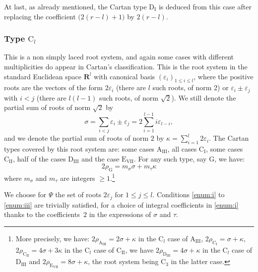 \documentclass[JEP,XML,SOM,Unicode,published]{cedram}
\newcommand{\rD}{\mathrm{D}}
\newcommand{\rI}{\mathrm{I}}
\newcommand{\RR}{\mathbf{R}}
\theoremstyle{plain}
\theoremstyle{remark}
\theoremstyle{definition}
\begin{document}
At last, as already mentioned, the Cartan type $\rD_\rI$ is deduced from this case after replacing the coefficient $ \bigl(2(r-l) + 1 \bigr)$ by $2(r-l)$.

\subsubsection*{Type $\mathrm{C}_l$
\cite[Planche III, p.\,254]{BBK-Lie-4to6}}
This is a non simply laced root system, and again some cases with different multiplicities do appear in Cartan's classification.
This is the root system in the standard Euclidean space $\RR^l$ with canonical basis $(\varepsilon_i)_{1 \leqslant i \leqslant l}$, where the positive roots are the vectors of the form $2 \varepsilon_i$ (there are $l$ such roots, of norm 2) or $\varepsilon_i \pm \varepsilon_j$ with $i<j$ (there are $l(l-1)$ such roots, of norm $\sqrt{2}$).
We still denote the partial sum of roots of norm $\sqrt{2}$ by
\[
\sigma = \sum_{i<j} \varepsilon_i \pm \varepsilon_j = 2 \sum_{i=1}^{l-1} i \varepsilon_{l-i},
\]
and we denote the partial sum of roots of norm $2$ by $\kappa = \sum_{i=1}^l 2\varepsilon_i$.
The Cartan types covered by this root system are: some cases $\mathrm{A}_\mathrm{III}$, all cases $\mathrm{C}_\rI$, some cases $\mathrm{C}_\mathrm{II}$, half of the cases $\rD_\mathrm{III}$ and the case $\mathrm{E}_\mathrm{VII}$.
For any such type, say $\mathrm{G}$, we have:
\[
2 \rho_\mathrm{G} = m_\sigma \sigma + m_\tau \kappa
\]
where $m_\sigma$ and $m_\tau$ are integers $\geqslant 1$.\footnote{More precisely, we have:
$2 \rho_{\mathrm{A}_\mathrm{III}} = 2 \sigma + \kappa$ in the $\mathrm{C}_l$ case of $\mathrm{A}_\mathrm{III}$,
$2 \rho_{\mathrm{C}_\rI} = \sigma + \kappa$,
$2 \rho_{\mathrm{C}_\mathrm{II}} = 4 \sigma + 3 \kappa$ in the $\mathrm{C}_l$ case of $\mathrm{C}_\mathrm{II}$,
we have $2 \rho_{\rD_\mathrm{III}} = 4 \sigma + \kappa$ in the $\mathrm{C}_l$ case of $\rD_\mathrm{III}$
and
$2 \rho_{\mathrm{E}_\mathrm{VII}} = 8 \sigma + \kappa$, the root system being $\mathrm{C}_3$ in the latter case.}

We choose for $\Psi$ the set of roots $2 \varepsilon_j$ for $1 \leqslant j \leqslant l$.
Conditions \eqref{enum:i} to \eqref{enum:iii} are trivially satisfied, for a choice of integral coefficients in \eqref{enum:i} thanks to the coefficients~$2$ in the expressions of $\sigma$ and $\tau$.
\end{document}
